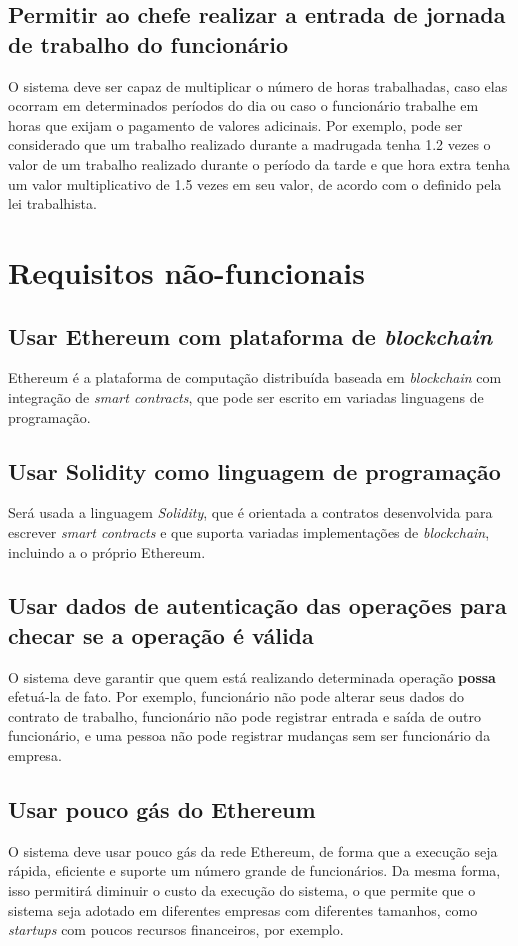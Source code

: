 \documentclass{article}
\begin{document}
\subsection{Permitir ao chefe realizar a entrada de jornada de trabalho do
funcionário}
O sistema deve ser capaz de multiplicar o número de horas trabalhadas, caso
elas ocorram em determinados períodos do dia ou caso o funcionário trabalhe em
horas que exijam o pagamento de valores adicinais.  Por exemplo, pode ser
considerado que um trabalho realizado durante a madrugada tenha 1.2 vezes o
valor de um trabalho realizado durante o período da tarde e que hora extra
tenha um valor multiplicativo de 1.5 vezes em seu valor, de acordo com o
definido pela lei trabalhista.

\section{Requisitos não-funcionais}

\subsection{Usar Ethereum com plataforma de \textit{blockchain}}
Ethereum é a plataforma de computação distribuída baseada em
\textit{blockchain} com integração de \textit{smart contracts}, que pode ser
escrito em variadas linguagens de programação.

\subsection{Usar Solidity como linguagem de programação}
Será usada a linguagem \textit{Solidity}, que é orientada a contratos
desenvolvida para escrever \textit{smart contracts} e que suporta variadas
implementações de \textit{blockchain}, incluindo a o próprio Ethereum.

\subsection{Usar dados de autenticação das operações para checar se a operação
é válida}
O sistema deve garantir que quem está realizando determinada operação
\textbf{possa} efetuá-la de fato. Por exemplo, funcionário não pode alterar
seus dados do contrato de trabalho, funcionário não pode registrar entrada e
saída de outro funcionário, e uma pessoa não pode registrar mudanças sem ser
funcionário da empresa.

\subsection{Usar pouco gás do Ethereum}
O sistema deve usar pouco gás da rede Ethereum, de forma que a execução seja
rápida, eficiente e suporte um número grande de funcionários. Da mesma forma,
isso permitirá diminuir o custo da execução do sistema, o que permite que o
sistema seja adotado em diferentes empresas com diferentes tamanhos, como
\textit{startups} com poucos recursos financeiros, por exemplo.
\end{document}
